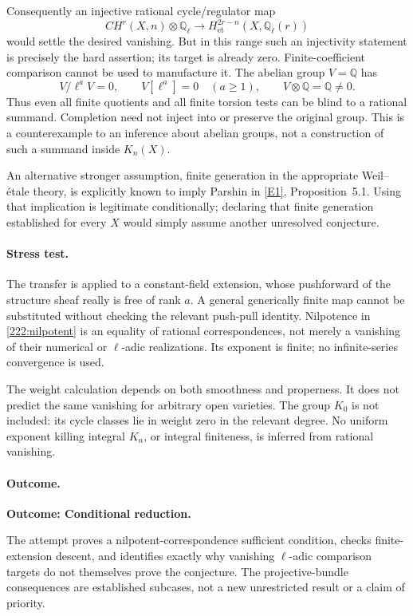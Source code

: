 \documentclass[11pt,a4paper]{article}
\newcommand{\Q}{\mathbb{Q}}
\newcommand{\eref}[2]{\hyperlink{extra:#1:#2}{[E#2]}}
\numberwithin{equation}{section}
\begin{document}
Consequently an injective rational cycle/regulator map
\[
 CH^r(X,n)\otimes\Q_\ell\longrightarrow
 H^{2r-n}_{\mathrm{et}}(X,\Q_\ell(r))
\]
would settle the desired vanishing. But in this range such an injectivity
statement is precisely the hard assertion; its target is already zero.
Finite-coefficient comparison cannot be used to manufacture it. The
abelian group $V=\Q$ has
\[
 V/\ell^aV=0,\qquad V[\ell^a]=0\quad(a\ge1),
 \qquad V\otimes\Q=\Q\ne0.
\]
Thus even all finite quotients and all finite torsion tests can be blind
to a rational summand. Completion need not inject into or preserve the
original group. This is a counterexample to an inference about abelian
groups, not a construction of such a summand inside $K_n(X)$.

An alternative stronger assumption, finite generation in the appropriate
Weil--\'etale theory, is explicitly known to imply Parshin in
\eref{222}{1}, Proposition~5.1. Using that implication is legitimate
conditionally; declaring that finite generation established for every
$X$ would simply assume another unresolved conjecture.

\paragraph{Stress test.}
The transfer is applied to a constant-field extension, whose pushforward
of the structure sheaf really is free of rank $a$. A general generically
finite map cannot be substituted without checking the relevant
push-pull identity. Nilpotence in \eqref{222:nilpotent} is an equality
of rational correspondences, not merely a vanishing of their numerical
or $\ell$-adic realizations. Its exponent is finite; no infinite-series
convergence is used.

The weight calculation depends on both smoothness and properness. It
does not predict the same vanishing for arbitrary open varieties.
The group $K_0$ is not included: its cycle classes lie in weight zero
in the relevant degree. No uniform exponent killing integral $K_n$, or
integral finiteness, is inferred from rational vanishing.

\paragraph{Outcome.}
\textbf{Outcome: Conditional reduction.}

The attempt proves a nilpotent-correspondence sufficient condition,
checks finite-extension descent, and identifies exactly why vanishing
$\ell$-adic comparison targets do not themselves prove the conjecture.
The projective-bundle consequences are established subcases, not a new
unrestricted result or a claim of priority.
\end{document}
